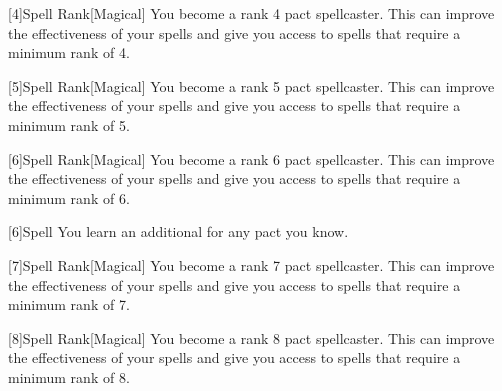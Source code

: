         [4]{Spell Rank}[Magical] You become a rank 4 pact spellcaster.
        This can improve the effectiveness of your spells and give you access to spells that require a minimum rank of 4.

        [5]{Spell Rank}[Magical] You become a rank 5 pact spellcaster.
        This can improve the effectiveness of your spells and give you access to spells that require a minimum rank of 5.

        [6]{Spell Rank}[Magical] You become a rank 6 pact spellcaster.
        This can improve the effectiveness of your spells and give you access to spells that require a minimum rank of 6.

        [6]{Spell} You learn an additional  for any pact  you know.

        [7]{Spell Rank}[Magical] You become a rank 7 pact spellcaster.
        This can improve the effectiveness of your spells and give you access to spells that require a minimum rank of 7.

        [8]{Spell Rank}[Magical] You become a rank 8 pact spellcaster.
        This can improve the effectiveness of your spells and give you access to spells that require a minimum rank of 8.





